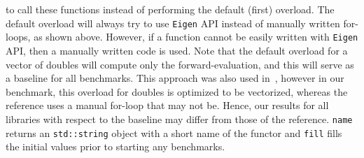 to call these functions instead of performing the default (first) overload.
The default overload will always try to use \verb|Eigen| API instead of manually written for-loops, as shown above.
However, if a function cannot be easily written with \verb|Eigen| API, then a manually written code is used.
Note that the default overload for a vector of doubles will compute only the forward-evaluation,
and this will serve as a baseline for all benchmarks.
This approach was also used in~\cite{carpenter:2015},
however in our benchmark, this overload for doubles is optimized to be vectorized,
whereas the reference uses a manual for-loop that may not be.
Hence, our results for all libraries with respect to the baseline may differ from those of the reference.
\verb|name| returns an \verb|std::string| object with a short name of the functor
and \verb|fill| fills the initial values prior to starting any benchmarks. 

